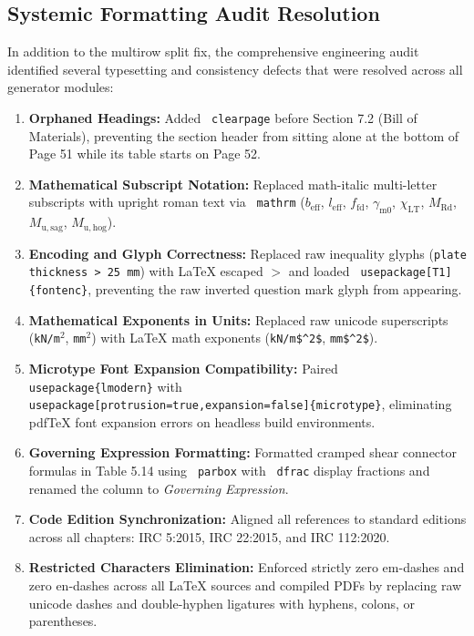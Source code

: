 \documentclass[12pt,a4paper]{article}
\begin{document}
\subsection{Systemic Formatting Audit Resolution}
In addition to the multirow split fix, the comprehensive engineering audit identified several typesetting and consistency defects that were resolved across all generator modules:
\begin{enumerate}
  \item \textbf{Orphaned Headings:} Added \texttt{ clearpage} before Section 7.2 (Bill of Materials), preventing the section header from sitting alone at the bottom of Page 51 while its table starts on Page 52.
  \item \textbf{Mathematical Subscript Notation:} Replaced math-italic multi-letter subscripts with upright roman text via \texttt{ mathrm} ($b_{\mathrm{eff}}$, $l_{\mathrm{eff}}$, $f_{\mathrm{fd}}$, $\gamma_{\mathrm{m0}}$, $\chi_{\mathrm{LT}}$, $M_{\mathrm{Rd}}$, $M_{\mathrm{u,sag}}$, $M_{\mathrm{u,hog}}$).
  \item \textbf{Encoding and Glyph Correctness:} Replaced raw inequality glyphs (\texttt{plate thickness > 25 mm}) with LaTeX escaped \texttt{$>$} and loaded \texttt{ usepackage[T1]\{fontenc\}}, preventing the raw inverted question mark glyph from appearing.
  \item \textbf{Mathematical Exponents in Units:} Replaced raw unicode superscripts (\texttt{kN/m$^2$}, \texttt{mm$^2$}) with LaTeX math exponents (\texttt{kN/m\$\textasciicircum 2\$}, \texttt{mm\$\textasciicircum 2\$}).
  \item \textbf{Microtype Font Expansion Compatibility:} Paired \texttt{ usepackage\{lmodern\}} with \texttt{ usepackage[protrusion=true,expansion=false]\{microtype\}}, eliminating pdfTeX font expansion errors on headless build environments.
  \item \textbf{Governing Expression Formatting:} Formatted cramped shear connector formulas in Table 5.14 using \texttt{ parbox} with \texttt{ dfrac} display fractions and renamed the column to \textit{Governing Expression}.
  \item \textbf{Code Edition Synchronization:} Aligned all references to standard editions across all chapters: IRC 5:2015, IRC 22:2015, and IRC 112:2020.
  \item \textbf{Restricted Characters Elimination:} Enforced strictly zero em-dashes and zero en-dashes across all LaTeX sources and compiled PDFs by replacing raw unicode dashes and double-hyphen ligatures with hyphens, colons, or parentheses.
\end{enumerate}
\end{document}
